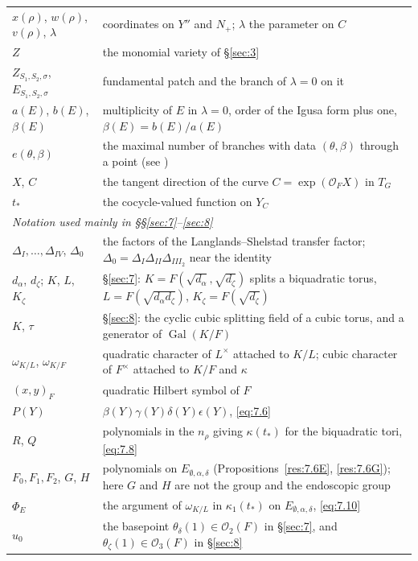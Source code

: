 \documentclass[12pt,letterpaper]{amsart}
\theoremstyle{plain}
\theoremstyle{definition}
\theoremstyle{remark}
\theoremstyle{definition}
\newcommand{\OF}{\mathcal{O}_F}
\DeclareMathOperator{\Gal}{Gal}
\begin{document}
\begin{longtable}{p{}p{}}
$x(\rho)$, $w(\rho)$, $v(\rho)$, $\lambda$ & coordinates on $Y''$ and $N_+$; $\lambda$ the parameter on $C$\\
$Z$ & the monomial variety of \S\ref{sec:3}\\
$Z_{S_1,S_2,\sigma}$, $E_{S_1,S_2,\sigma}$ & fundamental patch and the branch of $\lambda=0$ on it\\
$a(E)$, $b(E)$, $\beta(E)$ & multiplicity of $E$ in $\lambda=0$, order of the Igusa form plus one, $\beta(E)=b(E)/a(E)$\\
$e(\theta,\beta)$ & the maximal number of branches with data $(\theta,\beta)$ through a point (see \cite{La83})\\
$X$, $C$ & the tangent direction of the curve $C=\exp(\OF X)$ in $T_G$\\
$t_*$ & the cocycle-valued function on $Y_C$\\
\midrule
\multicolumn{2}{l}{\emph{Notation used mainly in \S\S\ref{sec:7}--\ref{sec:8}}}\\
\midrule
$\Delta_I,\dots,\Delta_{IV}$, $\Delta_0$ & the factors of the Langlands--Shelstad transfer factor; $\Delta_0=\Delta_I\Delta_{II}\Delta_{III_2}$ near the identity\\
$d_\alpha$, $d_\zeta$; $K$, $L$, $K_\zeta$ & \S\ref{sec:7}: $K=F(\sqrt{d_\alpha},\sqrt{d_\zeta})$ splits a biquadratic torus, $L=F(\sqrt{d_\alpha d_\zeta})$, $K_\zeta=F(\sqrt{d_\zeta})$\\
$K$, $\tau$ & \S\ref{sec:8}: the cyclic cubic splitting field of a cubic torus, and a generator of $\Gal(K/F)$\\
$\omega_{K/L}$, $\omega_{K/F}$ & quadratic character of $L^\times$ attached to $K/L$; cubic character of $F^\times$ attached to $K/F$ and $\kappa$\\
$(x,y)_F$ & quadratic Hilbert symbol of $F$\\
$P(Y)$ & $\beta(Y)\gamma(Y)\delta(Y)\epsilon(Y)$, \eqref{eq:7.6}\\
$R$, $Q$ & polynomials in the $n_\rho$ giving $\kappa(t_*)$ for the biquadratic tori, \eqref{eq:7.8}\\
$F_0,F_1,F_2$, $G$, $H$ & polynomials on $E_{\emptyset,\alpha,\delta}$ (Propositions~\ref{res:7.6E}, \ref{res:7.6G}); here $G$ and $H$ are not the group and the endoscopic group\\
$\Phi_E$ & the argument of $\omega_{K/L}$ in $\kappa_1(t_*)$ on $E_{\emptyset,\alpha,\delta}$, \eqref{eq:7.10}\\
$u_0$ & the basepoint $\theta_\delta(1)\in\mathcal O_2(F)$ in \S\ref{sec:7}, and $\theta_\zeta(1)\in\mathcal O_3(F)$ in \S\ref{sec:8}\\

\end{longtable}
\end{document}
